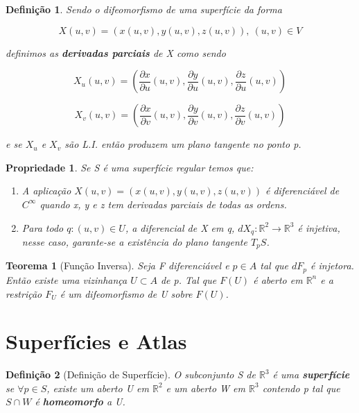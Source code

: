 \documentclass{article}
\newtheorem{prop}{Propriedade}
\newtheorem{theorem}{Teorema}
\newtheorem{definition}{Definição}
\begin{document}
\begin{definition}
Sendo o difeomorfismo de uma superfície da forma

$$X(u, v) = (x(u, v), y(u, v), z(u, v)),\ (u,v) \in V$$

definimos as \textbf{derivadas parciais} de X como sendo

$$X_u(u, v) = \left( \frac{\partial x}{\partial u}(u, v), \frac{\partial y}{\partial u}(u, v), \frac{\partial z}{\partial u}(u, v) \right)$$

$$X_v(u, v) = \left( \frac{\partial x}{\partial v}(u, v), \frac{\partial y}{\partial v}(u, v), \frac{\partial z}{\partial v}(u, v) \right)$$

e se $X_u$ e $X_v$ são L.I. então produzem um plano tangente no ponto p.
\end{definition}

\begin{prop}
Se S é uma superfície regular temos que:

\begin{enumerate}[label=(\alph*)]
    \item A aplicação $X(u, v) = (x(u, v), y(u, v), z(u, v))$ é diferenciável de $C^\infty$ quando x, y e z tem derivadas parciais de todas as ordens.
    
    \item Para todo $q: (u, v) \in U$, a diferencial de X em q, $dX_q: \mathbb{R}^2 \rightarrow \mathbb{R}^3$ é injetiva, nesse caso, garante-se a existência do plano tangente $T_p S$.
\end{enumerate}
\end{prop}

\begin{theorem}[Função Inversa]
Seja F diferenciável e $p \in A$ tal que $dF_p$ é injetora. Então existe uma vizinhança $U \subset A$ de p. Tal que $F(U)$ é aberto em $\mathbb{R}^n$ e a restrição $F_U$ é um difeomorfismo de U sobre $F(U)$.
\end{theorem}

\section*{Superfícies e Atlas}
\label{s8}
\begin{definition}[Definição de Superfície]
O subconjunto S de $\mathbb{R}^3$ é uma \textbf{superfície} se $\forall p \in S$, existe um aberto U em $\mathbb{R}^2$ e um aberto W em $\mathbb{R}^3$ contendo p tal que $S \cap W$ é \textbf{homeomorfo} a U.
\end{definition}
\end{document}
